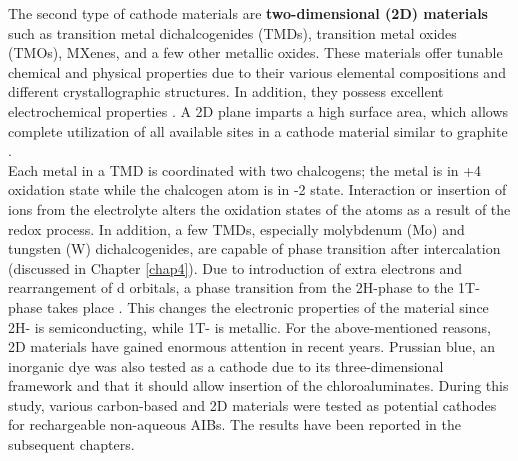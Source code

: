 
The second type of cathode materials are \textbf{two-dimensional (2D) materials} such as transition metal dichalcogenides (TMDs), transition metal oxides (TMOs), MXenes, and a few other metallic oxides. These materials offer tunable chemical and physical properties due to their various elemental compositions and different crystallographic structures. In addition, they possess excellent electrochemical properties \cite{chia_electrochemistry_2015}. A 2D plane imparts a high surface area, which allows complete utilization of all available sites in a cathode material similar to graphite \cite{jia_interfacial_2016, naguib_mxene_2012}.\\ 
Each metal in a TMD is coordinated with two chalcogens; the metal is in +4 oxidation state while the chalcogen atom is in -2 state. Interaction or insertion of ions from the electrolyte alters the oxidation states of the atoms as a result of the redox process. In addition, a few TMDs, especially molybdenum (Mo) and tungsten (W) dichalcogenides, are capable of phase transition after intercalation (discussed in Chapter \ref{chap4}). Due to introduction of extra electrons and rearrangement of d orbitals, a phase transition from the 2H-phase to the 1T-phase takes place \cite{acerce_metallic_2015-1}. This changes the electronic properties of the material since 2H- is semiconducting, while 1T- is metallic. For the above-mentioned reasons, 2D materials have gained enormous attention in recent years. Prussian blue, an inorganic dye was also tested as a cathode due to its three-dimensional framework and that it should allow insertion of the chloroaluminates. 
During this study, various carbon-based and 2D materials were tested as potential cathodes for rechargeable non-aqueous AIBs. The results have been reported in the subsequent chapters.

